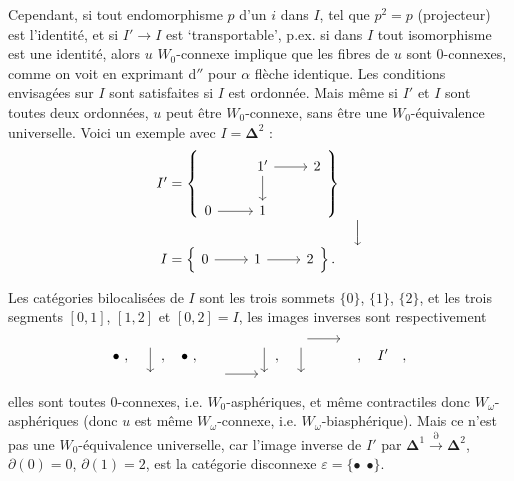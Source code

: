 \documentclass[11pt]{article}
\newcommand{\printedpage}[1]{\marginpar{\footnotesize p.~#1}}
\newcommand{\msp}[1]{\marginpar{\footnotesize [#1]}}
\newcommand{\bDelta}{\boldsymbol{\Delta}}
\begin{document}
Cependant, si tout endomorphisme $p$ d'un $i$ dans $I$, tel que $p^2 = p$ (projecteur) est l'identité, et si \msp{page 57}$I' \longrightarrow I$ est `transportable', p.ex. si dans $I$ tout isomorphisme est une identité, alors $u$ $W_0$-connexe implique que les fibres de $u$ sont 0-connexes, comme on voit en exprimant d$''$ pour $\alpha$ flèche identique. Les conditions envisagées sur $I$ sont satisfaites si $I$ est ordonnée. Mais même si $I'$ et $I$ sont toutes deux ordonnées, $u$ peut être $W_0$-connexe, sans être une $W_0$-équivalence universelle. Voici un exemple avec $I = \bDelta^2$ :
\[
\begin{array}{r@{\;}l@{\quad}c}
I' = & \left\{\begin{tikzcd}[ampersand replacement=\&]
 \& 1' \arrow[r] \arrow[d] \& 2 \\
0 \arrow[r] \& 1 \&
\end{tikzcd}\right\} & \\[1ex]
 & & \Big\downarrow \\[1ex]
I = & \left\{\begin{tikzcd}[ampersand replacement=\&]
0 \arrow[r] \& 1 \arrow[r] \& 2
\end{tikzcd}\right\}. &
\end{array}
\]

\printedpage{36}
Les catégories bilocalisées de $I$ sont les trois sommets $\{0\}$, $\{1\}$, $\{2\}$, et les trois segments $[0,1]$, $[1,2]$ et $[0,2] = I$, les images inverses sont respectivement
\[
\bullet\ ,\quad
\begin{tikzcd}[row sep=normal] {} \arrow[d] \\ {} \end{tikzcd}\ ,\quad
\bullet\ ,\quad
\begin{tikzcd}[row sep=normal] & {} \arrow[d] \\ {} \arrow[r] & {} \end{tikzcd}\ ,\quad
\begin{tikzcd}[row sep=normal] {} \arrow[r] \arrow[d] & {} \\ {} & \end{tikzcd}\ ,\quad
I'\quad ,
\]
elles sont toutes 0-connexes, i.e. $W_0$-asphériques, et même contractiles donc $W_\omega$-asphériques (donc $u$ est même $W_\omega$-connexe, i.e. $W_\omega$-biasphérique). Mais ce n'est pas une $W_0$-équivalence universelle, car l'image inverse de $I'$ par $\bDelta^1 \xrightarrow{\partial} \bDelta^2$, $\partial(0) = 0$, $\partial(1) = 2$, \msp{page 58}est la catégorie disconnexe $\varepsilon = \{\bullet\ \ \bullet\}$.
\end{document}
